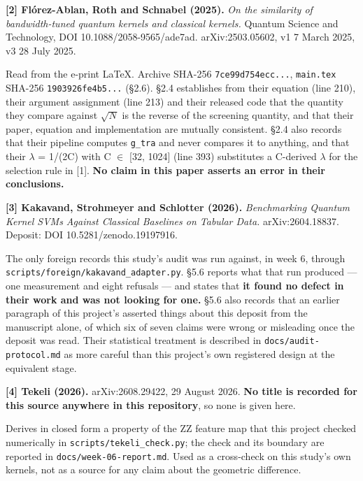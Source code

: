 \documentclass[
  10pt,
]{article}
\newcounter{none} %
\begin{document}
\textbf{{[}2{]} Flórez-Ablan, Roth and Schnabel (2025).} \emph{On the
similarity of bandwidth-tuned quantum kernels and classical kernels.}
Quantum Science and Technology, DOI 10.1088/2058-9565/ade7ad.
arXiv:2503.05602, v1 7 March 2025, v3 28 July 2025.

Read from the e-print LaTeX. Archive SHA-256 \texttt{7ce99d754ecc...},
\texttt{main.tex} SHA-256 \texttt{1903926fe4b5...} (\S{}2.6). \S{}2.4
establishes from their equation (line 210), their argument assignment
(line 213) and their released code that the quantity they compare
against \(\sqrt{N}\) is the reverse of the screening quantity, and that
their paper, equation and implementation are mutually consistent.
\S{}2.4 also records that their pipeline computes \texttt{g\_\allowbreak{}tra} and
never compares it to anything, and that their \(\lambda\) = 1/(2C) with
C \(\in\) {[}32, 1024{]} (line 393) substitutes a C-derived \(\lambda\)
for the selection rule in {[}1{]}. \textbf{No claim in this paper
asserts an error in their conclusions.}

\textbf{{[}3{]} Kakavand, Strohmeyer and Schlotter (2026).}
\emph{Benchmarking Quantum Kernel SVMs Against Classical Baselines on
Tabular Data.} arXiv:2604.18837. Deposit: DOI 10.5281/zenodo.19197916.

The only foreign records this study's audit was run against, in week 6,
through \texttt{scripts/\allowbreak{}foreign/\allowbreak{}kakavand\_\allowbreak{}adapter.py}. \S{}5.6 reports
what that run produced --- one measurement and eight refusals --- and
states that \textbf{it found no defect in their work and was not looking
for one.} \S{}5.6 also records that an earlier paragraph of this
project's asserted things about this deposit from the manuscript alone,
of which six of seven claims were wrong or misleading once the deposit
was read. Their statistical treatment is described in
\texttt{docs/\allowbreak{}audit-protocol.md} as more careful than this project's own
registered design at the equivalent stage.

\textbf{{[}4{]} Tekeli (2026).} arXiv:2608.29422, 29 August 2026.
\textbf{No title is recorded for this source anywhere in this
repository}, so none is given here.

Derives in closed form a property of the ZZ feature map that this
project checked numerically in \texttt{scripts/\allowbreak{}tekeli\_\allowbreak{}check.py}; the
check and its boundary are reported in \texttt{docs/\allowbreak{}week-06-report.md}.
Used as a cross-check on this study's own kernels, not as a source for
any claim about the geometric difference.
\end{document}
